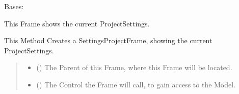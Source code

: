 \documentclass[letterpaper,10pt,english]{sphinxmanual}
\begin{document}
\begin{fulllineitems}
\label{\detokenize{apidoc/src.osm_configurator.view.utilityframes:src.osm_configurator.view.utilityframes.settings_project_frame.SettingsProjectFrame}}
\pysigstartsignatures
{}
\pysigstopsignatures
\sphinxAtStartPar
Bases: 

\sphinxAtStartPar
This Frame shows the current Project\sphinxhyphen{}Settings.

\begin{fulllineitems}
\label{\detokenize{apidoc/src.osm_configurator.view.utilityframes:src.osm_configurator.view.utilityframes.settings_project_frame.SettingsProjectFrame.__init__}}
\pysigstartsignatures
{}
\pysigstopsignatures
\sphinxAtStartPar
This Method Creates a SettingsProjectFrame, showing the current Project\sphinxhyphen{}Settings.
\begin{quote}\begin{description}
\begin{itemize}
\item {} 
\sphinxAtStartPar
{} ({\hyperref[\detokenize{apidoc/src.osm_configurator.view.toplevelframes:src.osm_configurator.view.toplevelframes.settings_frame.SettingsFrame}]{}}) \textendash{} The Parent of this Frame, where this Frame will be located.

\item {} 
\sphinxAtStartPar
{} ({\hyperref[\detokenize{apidoc/src.osm_configurator.control:src.osm_configurator.control.control_interface.IControl}]{}}) \textendash{} The Control the Frame will call, to gain access to the Model.

\end{itemize}

\end{description}\end{quote}

\end{fulllineitems}


\end{fulllineitems}
\end{document}
